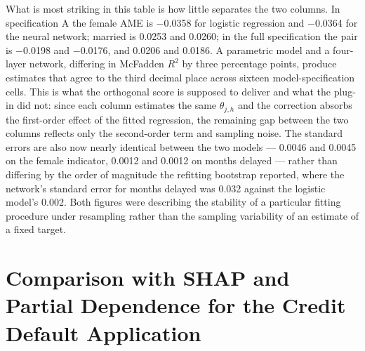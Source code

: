 \documentclass[12pt,a4paper]{article}
\numberwithin{equation}{section}
\theoremstyle{plain}
\theoremstyle{definition}
\begin{document}
	What is most striking in this table is how little separates the two columns. In specification A the female AME is $-$0.0358 for logistic regression and $-$0.0364 for the neural network; married is 0.0253 and 0.0260; in the full specification the pair is $-$0.0198 and $-$0.0176, and 0.0206 and 0.0186. A parametric model and a four-layer network, differing in McFadden $R^2$ by three percentage points, produce estimates that agree to the third decimal place across sixteen model-specification cells. This is what the orthogonal score is supposed to deliver and what the plug-in did not: since each column estimates the same $\theta_{j,h}$ and the correction absorbs the first-order effect of the fitted regression, the remaining gap between the two columns reflects only the second-order term and sampling noise. The standard errors are also now nearly identical between the two models --- 0.0046 and 0.0045 on the female indicator, 0.0012 and 0.0012 on months delayed --- rather than differing by the order of magnitude the refitting bootstrap reported, where the network's standard error for months delayed was 0.032 against the logistic model's 0.002. Both figures were describing the stability of a particular fitting procedure under resampling rather than the sampling variability of an estimate of a fixed target.

		\section{Comparison with SHAP and Partial Dependence for the
	Credit Default Application}
	\label{app:credit_methods}
\end{document}
